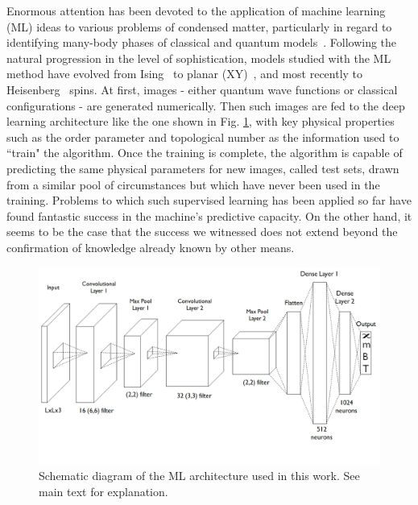 \documentclass[reprint,amsmath,amssymb,aps,showpacs,superscriptaddress,prl]{revtex4-1}
\begin{document}
Enormous attention has been devoted to the application of machine learning (ML) ideas to various problems of condensed matter, particularly in regard to identifying many-body phases of classical and quantum models~\cite{melko16,wang16,melko17,melko17b,melko17c,tanaka17,scalettar17,wetzel17,wetzel17b,iso18,kim18,zhai17,scalettar17,beach18,zhai18,russian18}.
Following the natural progression in the level of sophistication, models studied with the ML method have evolved from Ising~\cite{melko16,wang16,melko17,melko17b,melko17c,tanaka17,scalettar17,wetzel17,wetzel17b,iso18,kim18} to planar (XY)~\cite{zhai17,scalettar17,wetzel17b,beach18,zhai18}, and most recently to Heisenberg~\cite{russian18} spins. At first, images - either quantum wave functions or classical configurations - are generated numerically. Then such images are fed to the deep learning architecture like the one shown in Fig. \ref{fig:1}, with key physical properties such as the order parameter and topological number as the information used to ``train" the algorithm. Once the training is complete, the algorithm is capable of predicting the same physical parameters for new images, called test sets, drawn from a similar pool of circumstances but which have never been used in the training. Problems to which such supervised learning has been applied so far have found fantastic success in the machine's predictive capacity. On the other hand, it seems to be the case that the success we witnessed does not extend beyond the confirmation of knowledge already known by other means.
%
\begin{figure}[ht]
\includegraphics[scale=0.35]{fig1.png}
\caption{Schematic diagram of the ML architecture used in this work. See main text for explanation.}\label{fig:1}
\end{figure}
\end{document}
